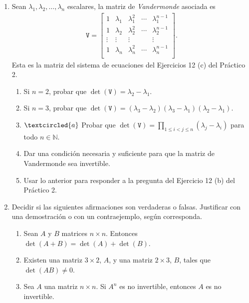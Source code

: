 \begin{enumerate}[topsep=6pt,itemsep=.4cm]
\item\label{vandermonde} Sean $\lambda_1, \lambda_2, \dots, \lambda_n$ escalares, la matriz de \emph{Vandermonde} asociada es
\begin{align*}
\mathtt V = \begin{bmatrix}
1 & \lambda_1 & \lambda_1^2 & \cdots & \lambda_1^{n-1}\\
1 & \lambda_2 & \lambda_2^2 & \cdots & \lambda_2^{n-1}\\
\vdots &\vdots &\vdots & &\vdots\\
1 & \lambda_n & \lambda_n^2 & \cdots & \lambda_n^{n-1}\\
\end{bmatrix}.
\end{align*}
Esta es la matriz del sistema de ecuaciones del Ejercicios 12 (c) del Práctico 2.


\begin{enumerate}
	\item Si $n=2$, probar que $\det(\mathtt V) = \lambda_2-\lambda_1$.
	\item Si $n=3$, probar que $\det(\mathtt V) = (\lambda_3-\lambda_2) (\lambda_3-\lambda_1) (\lambda_2-\lambda_1)$.
	\item\label{vandermonde gral} $\textcircled{a}$ Probar que $\det(\mathtt V) = \prod_{1\leq i< j \leq n}(\lambda_j-\lambda_i)$ para todo $n\in\mathbb{N}$.
	\item Dar una condición necesaria y suficiente para que la matriz de Vandermonde sea invertible.
	\item Usar lo anterior para responder a la pregunta del Ejercicio 12 (b) del Práctico 2.
	\end{enumerate}
	\item Decidir si las siguientes afirmaciones son verdaderas o falsas. Justificar con una demostración o con un contraejemplo, según corresponda.
	\begin{enumerate}
	\item Sean $A$ y $B$ matrices $n \times n$. Entonces $\det(A + B) = \det (A) + \det(B)$.
	\item Existen una matriz $3\times 2$, $A$, y una matriz $2\times 3$, $B$, tales que $\det(AB) \neq 0$.
	\item Sea $A$ una matriz $n\times n$. Si $A^n$ es no invertible, entonces $A$ es no invertible.
\end{enumerate}

\end{enumerate}



